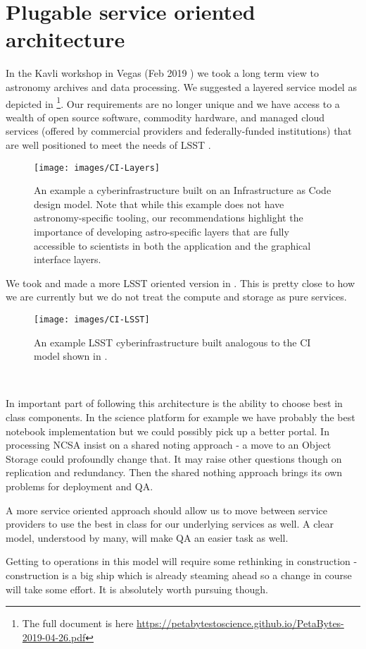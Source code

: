 
\section{Plugable service oriented architecture} \label{sec:arc}

In the Kavli workshop in Vegas (Feb 2019 \cite{2019arXiv190505116B}) we took a long term view to astronomy archives and data processing.
We suggested a layered service model as depicted in \footnote{The full document is here \url{https://petabytestoscience.github.io/PetaBytes-2019-04-26.pdf}}.
Our requirements are no longer unique and we have access to a wealth of open source \gls{software}, commodity hardware, and managed \gls{cloud} services (offered by commercial providers and federally-funded institutions) that are well positioned to meet the needs of \gls{LSST} \cite{2019AAS...23345706M, 2019AAS...23324505B}.


\begin{figure}
    \centering
    \texttt{[image: images/CI-Layers]}
    \caption{An example a \gls{cyberinfrastructure} built on an Infrastructure as Code design model. Note that while this example does not have astronomy-specific tooling, our recommendations highlight the importance of developing astro-specific layers that are fully accessible to scientists in both  the application  and the graphical interface layers. \label{fig:CI}}
\end{figure}


We took  and made a more \gls{LSST} oriented version in . This is pretty close to how we are currently but we do not treat the compute and storage as pure services.

\begin{figure}
    \centering
    \texttt{[image: images/CI-LSST]}
    \caption{An example \gls{LSST}  \gls{cyberinfrastructure} built analogous to the \gls{CI} model shown in .}
    \label{fig:CI-LSST}
\end{figure}\

In important part of following this architecture is the ability to choose best in class components. In the science platform for example we have probably the best notebook implementation but we could possibly pick up a better portal. In processing \gls{NCSA} insist on a shared noting approach - a move to an \gls{Object Storage} could profoundly change that. It may raise other questions though on replication and redundancy. Then the shared nothing approach brings its own problems for deployment and \gls{QA}.

A more service oriented approach should allow us to move between service providers to use the best in class for our underlying services as well.  A clear model, understood by many, will make \gls{QA} an easier task as well.


Getting to operations in this model will require some rethinking in construction - construction is a big ship which is already steaming ahead so a change in course will take some effort. It is absolutely worth pursuing though.



